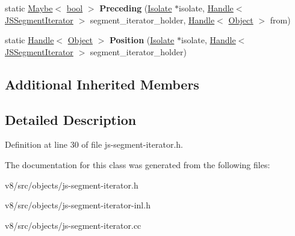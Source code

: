 \begin{DoxyCompactItemize}
static \mbox{\hyperlink{classv8_1_1Maybe}{Maybe}}$<$ \mbox{\hyperlink{classbool}{bool}} $>$ {\bfseries Preceding} (\mbox{\hyperlink{classv8_1_1internal_1_1Isolate}{Isolate}} $\ast$isolate, \mbox{\hyperlink{classv8_1_1internal_1_1Handle}{Handle}}$<$ \mbox{\hyperlink{classv8_1_1internal_1_1JSSegmentIterator}{J\+S\+Segment\+Iterator}} $>$ segment\+\_\+iterator\+\_\+holder, \mbox{\hyperlink{classv8_1_1internal_1_1Handle}{Handle}}$<$ \mbox{\hyperlink{classv8_1_1internal_1_1Object}{Object}} $>$ from)
\item 
\mbox{\label{classv8_1_1internal_1_1JSSegmentIterator_ae7abf1632017eb401b781caff476ad5a}} 
static \mbox{\hyperlink{classv8_1_1internal_1_1Handle}{Handle}}$<$ \mbox{\hyperlink{classv8_1_1internal_1_1Object}{Object}} $>$ {\bfseries Position} (\mbox{\hyperlink{classv8_1_1internal_1_1Isolate}{Isolate}} $\ast$isolate, \mbox{\hyperlink{classv8_1_1internal_1_1Handle}{Handle}}$<$ \mbox{\hyperlink{classv8_1_1internal_1_1JSSegmentIterator}{J\+S\+Segment\+Iterator}} $>$ segment\+\_\+iterator\+\_\+holder)
\end{DoxyCompactItemize}
\subsection*{Additional Inherited Members}


\subsection{Detailed Description}


Definition at line 30 of file js-\/segment-\/iterator.\+h.



The documentation for this class was generated from the following files\+:\begin{DoxyCompactItemize}
\item 
v8/src/objects/js-\/segment-\/iterator.\+h\item 
v8/src/objects/js-\/segment-\/iterator-\/inl.\+h\item 
v8/src/objects/js-\/segment-\/iterator.\+cc\end{DoxyCompactItemize}
